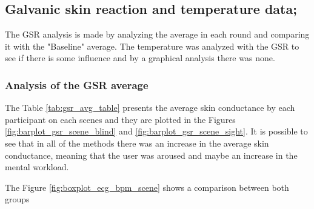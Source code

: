\subsection{Galvanic skin reaction and temperature data;}
\label{subsec:results_gsr_temp}

The GSR analysis is made by analyzing the average in each round and comparing it with the "Baseline" average. The temperature was analyzed with the GSR to see if there is some influence and by a graphical analysis there was none.

\subsubsection{Analysis of the GSR average}

The Table \ref{tab:gsr_avg_table} presents the average skin conductance by each participant on each scenes and they are plotted in the Figures \ref{fig:barplot_gsr_scene_blind} and \ref{fig:barplot_gsr_scene_sight}. It is possible to see that in all of the methods there was an increase in the average skin conductance, meaning that the user was aroused and maybe an increase in the mental workload.

%


The Figure \ref{fig:boxplot_ecg_bpm_scene} shows a comparison between both groups

